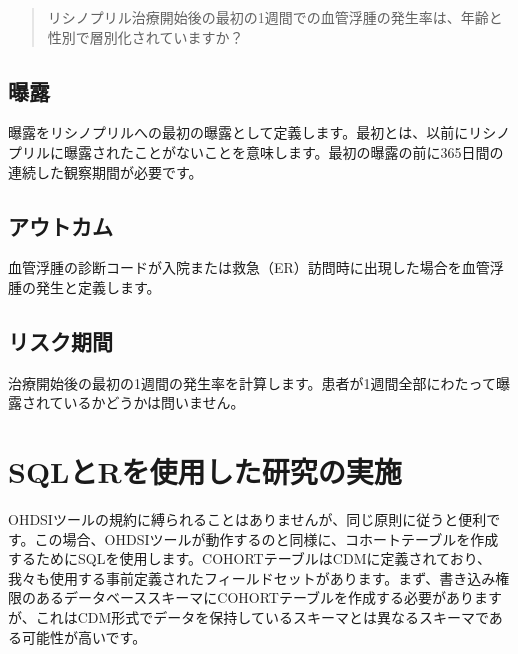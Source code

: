 \documentclass[
  11pt]{book}
\theoremstyle{definition}
\theoremstyle{definition}
\theoremstyle{definition}
\theoremstyle{definition}
\theoremstyle{remark}
\begin{document}
\begin{quote}
リシノプリル治療開始後の最初の1週間での血管浮腫の発生率は、年齢と性別で層別化されていますか？
\end{quote}

\subsection{曝露}\label{ux66ddux9732}

曝露をリシノプリルへの最初の曝露として定義します。最初とは、以前にリシノプリルに曝露されたことがないことを意味します。最初の曝露の前に365日間の連続した観察期間が必要です。

\subsection{アウトカム}\label{ux30a2ux30a6ux30c8ux30abux30e0}

血管浮腫の診断コードが入院または救急（ER）訪問時に出現した場合を血管浮腫の発生と定義します。

\subsection{リスク期間}\label{ux30eaux30b9ux30afux671fux9593}

治療開始後の最初の1週間の発生率を計算します。患者が1週間全部にわたって曝露されているかどうかは問いません。

\section{SQLとRを使用した研究の実施}\label{sqlux3068rux3092ux4f7fux7528ux3057ux305fux7814ux7a76ux306eux5b9fux65bd}

OHDSIツールの規約に縛られることはありませんが、同じ原則に従うと便利です。この場合、OHDSIツールが動作するのと同様に、コホートテーブルを作成するためにSQLを使用します。COHORTテーブルはCDMに定義されており、我々も使用する事前定義されたフィールドセットがあります。まず、書き込み権限のあるデータベーススキーマにCOHORTテーブルを作成する必要がありますが、これはCDM形式でデータを保持しているスキーマとは異なるスキーマである可能性が高いです。
\end{document}
